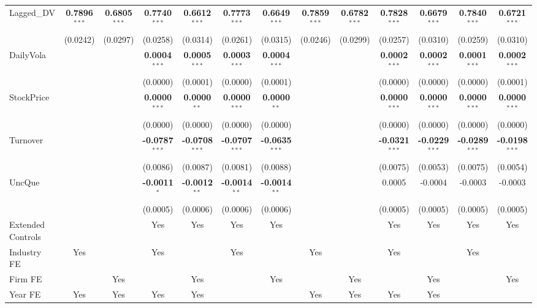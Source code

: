 \begin{landscape}
\begin{table}[H]
\begin{tabular}{lcccccccccccc}
Lagged\_DV & \textbf{0.7896}$^{***}$ & \textbf{0.6805}$^{***}$ & \textbf{0.7740}$^{***}$ & \textbf{0.6612}$^{***}$ & \textbf{0.7773}$^{***}$ & \textbf{0.6649}$^{***}$ & \textbf{0.7859}$^{***}$ & \textbf{0.6782}$^{***}$ & \textbf{0.7828}$^{***}$ & \textbf{0.6679}$^{***}$ & \textbf{0.7840}$^{***}$ & \textbf{0.6721}$^{***}$ \\
 & (0.0242) & (0.0297) & (0.0258) & (0.0314) & (0.0261) & (0.0315) & (0.0246) & (0.0299) & (0.0257) & (0.0310) & (0.0259) & (0.0310) \\
DailyVola &  &  & \textbf{0.0004}$^{***}$ & \textbf{0.0005}$^{***}$ & \textbf{0.0003}$^{***}$ & \textbf{0.0004}$^{***}$ &  &  & \textbf{0.0002}$^{***}$ & \textbf{0.0002}$^{***}$ & \textbf{0.0001}$^{***}$ & \textbf{0.0002}$^{***}$ \\
 &  &  & (0.0000) & (0.0001) & (0.0000) & (0.0001) &  &  & (0.0000) & (0.0000) & (0.0000) & (0.0001) \\
StockPrice &  &  & \textbf{0.0000}$^{***}$ & \textbf{0.0000}$^{**}$ & \textbf{0.0000}$^{***}$ & \textbf{0.0000}$^{**}$ &  &  & \textbf{0.0000}$^{***}$ & \textbf{0.0000}$^{***}$ & \textbf{0.0000}$^{***}$ & \textbf{0.0000}$^{***}$ \\
 &  &  & (0.0000) & (0.0000) & (0.0000) & (0.0000) &  &  & (0.0000) & (0.0000) & (0.0000) & (0.0000) \\
Turnover &  &  & \textbf{-0.0787}$^{***}$ & \textbf{-0.0708}$^{***}$ & \textbf{-0.0707}$^{***}$ & \textbf{-0.0635}$^{***}$ &  &  & \textbf{-0.0321}$^{***}$ & \textbf{-0.0229}$^{***}$ & \textbf{-0.0289}$^{***}$ & \textbf{-0.0198}$^{***}$ \\
 &  &  & (0.0086) & (0.0087) & (0.0081) & (0.0088) &  &  & (0.0075) & (0.0053) & (0.0075) & (0.0054) \\
UncQue &  &  & \textbf{-0.0011}$^{*}$ & \textbf{-0.0012}$^{**}$ & \textbf{-0.0014}$^{**}$ & \textbf{-0.0014}$^{**}$ &  &  & 0.0005 & -0.0004 & -0.0003 & -0.0003 \\
 &  &  & (0.0005) & (0.0006) & (0.0006) & (0.0006) &  &  & (0.0005) & (0.0005) & (0.0005) & (0.0005) \\
\midrule
Extended Controls &  &  & Yes & Yes & Yes & Yes &  &  & Yes & Yes & Yes & Yes \\
Industry FE & Yes &  & Yes &  & Yes &  & Yes &  & Yes &  & Yes &  \\
Firm FE &  & Yes &  & Yes &  & Yes &  & Yes &  & Yes &  & Yes \\
Year FE & Yes & Yes & Yes & Yes &  &  & Yes & Yes & Yes & Yes &  &  \\

\end{tabular}
\end{table}
\end{landscape}
